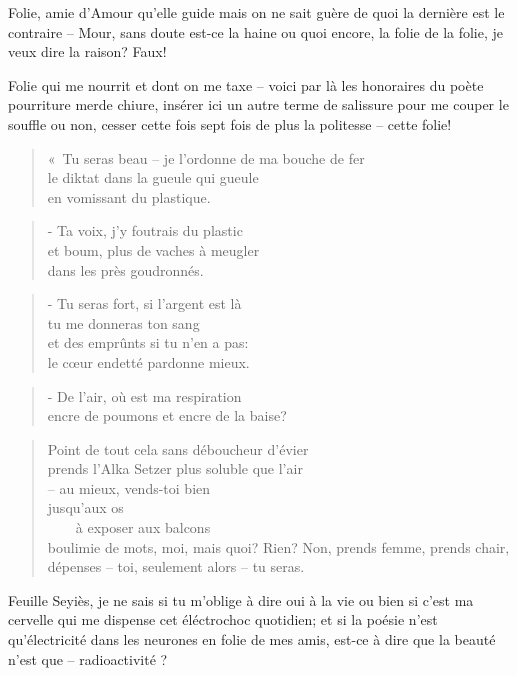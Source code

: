   Folie,  amie d’Amour  qu’elle guide  mais on  ne sait  guère de  quoi la
  dernière  est le  contraire --  Mour,  sans doute  est-ce la  haine ou  quoi
  encore, la folie de la folie, je veux dire la raison? Faux!

  Folie qui me  nourrit et dont on me  taxe -- voici par là  les honoraires du
  poète pourriture merde chiure, insérer ici un autre terme de salissure pour
  me couper le souffle ou non, cesser cette fois sept fois de plus la politesse
  -- cette folie!

  \begin{verse}
    «~Tu seras beau -- je l’ordonne de ma bouche de fer\\
    le diktat dans la gueule qui gueule\\
    en vomissant du plastique.\\
  \end{verse}
  \begin{verse}
    - Ta voix, j’y foutrais du plastic\\
    et b{\large ou}{\Large m}, plus de vaches à meugler\\
    dans les près goudronnés.
  \end{verse}
  \begin{verse}
    - Tu seras fort, si l’argent est là\\
    tu me donneras ton sang\\
    et des emprûnts si tu n’en a pas:\\
    le cœur endetté pardonne mieux.
  \end{verse}
  \begin{verse}
    - De l’air, où est ma respiration\\
    encre de poumons et encre de la baise?
  \end{verse}
  \begin{verse}
    Point de tout cela sans déboucheur d’évier\\
    prends l’Alka Setzer plus soluble que l’air\\
    -- au mieux, vends-toi bien\\
    jusqu’aux os\\
    ~~~~à exposer aux balcons\\
    boulimie de mots, moi, mais quoi? Rien? Non, prends femme, prends chair,
    dépenses -- toi, seulement alors -- tu seras.
  \end{verse}

  Feuille Seyiès, je ne sais si tu m’oblige à dire oui à la vie ou bien si
  c’est ma  cervelle qui me  dispense cet  éléctrochoc quotidien; et  si la
  poésie n’est  qu’électricité dans les  neurones en folie de  mes amis,
  est-ce à dire que la beauté n’est que -- radioactivité ?

